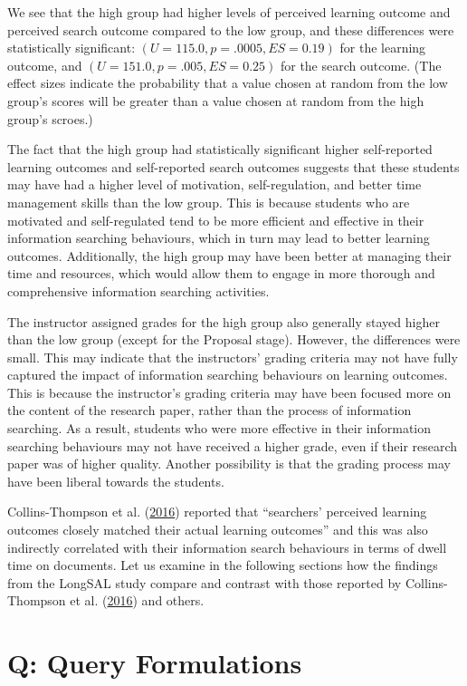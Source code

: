 \documentclass[letterpaper, nobind]{templates/ociamthesis}
\begin{document}
We see that the high group had higher levels of perceived learning outcome and perceived search outcome compared to the low group, and these differences were statistically significant: \((U = 115.0, p = .0005, ES = 0.19)\) for the learning outcome, and \((U = 151.0, p = .005, ES = 0.25)\) for the search outcome.
(The effect sizes indicate the probability that a value chosen at random from the low group's scores will be greater than a value chosen at random from the high group's scroes.)

The fact that the high group had statistically significant higher self-reported learning outcomes and self-reported search outcomes suggests that these students may have had a higher level of motivation, self-regulation, and better time management skills than the low group.
This is because students who are motivated and self-regulated tend to be more efficient and effective in their information searching behaviours, which in turn may lead to better learning outcomes.
Additionally, the high group may have been better at managing their time and resources, which would allow them to engage in more thorough and comprehensive information searching activities.

The instructor assigned grades for the high group also generally stayed higher than the low group (except for the Proposal stage). However, the differences were small.
This may indicate that the instructors' grading criteria may not have fully captured the impact of information searching behaviours on learning outcomes.
This is because the instructor's grading criteria may have been focused more on the content of the research paper, rather than the process of information searching. As a result, students who were more effective in their information searching behaviours may not have received a higher grade, even if their research paper was of higher quality.
Another possibility is that the grading process may have been liberal towards the students.

Collins-Thompson et al. (\protect\hyperlink{ref-collins2016assessing}{2016}) reported that ``searchers' perceived learning outcomes closely matched their actual learning outcomes'' and this was also indirectly correlated with their information search behaviours in terms of dwell time on documents.
Let us examine in the following sections how the findings from the LongSAL study compare and contrast with those reported by Collins-Thompson et al. (\protect\hyperlink{ref-collins2016assessing}{2016}) and others.

\hypertarget{q-query-formulations}{%
\section{Q: Query Formulations}\label{q-query-formulations}}
\end{document}
